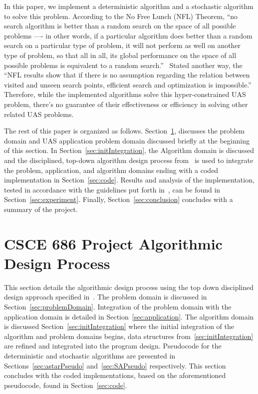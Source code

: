 \documentclass[conference]{IEEEtran}
\begin{document}
In this paper, we implement a deterministic algorithm and a stochastic
algorithm to solve this problem. According to the No Free Lunch (NFL) Theorem,
``no search algorithm is better than a random search on the space of all
possible problems —- in other words, if a particular algorithm does better than
a random search on a particular type of problem, it will not perform as well on
another type of problem, so that all in all, its global performance on the
space of all possible problems is equivalent to a random
search.''~\cite{collet2007, wiki:nfl} Stated another way, the ``NFL results
show that if there is no assumption regarding the relation between visited and
unseen search points, efficient search and optimization is
impossible.''~\cite{igel2014} Therefore, while the implemented algorithms solve
this hyper-constrained UAS problem, there's no guarantee of their effectiveness
or efficiency in solving other related UAS problems.

The rest of this paper is organized as follows.
Section~\ref{sec:designProcess}, discusses the problem domain and UAS
application problem domain discussed briefly at the beginning of this section.
In Section~\ref{sec:initIntegration}, the Algorithm domain is discussed and the
disciplined, top-down algorithm design process from~\cite{lamontDesign,
lamontSCP, lamontMIS} is used to integrate the problem, application, and
algorithm domains ending with a coded implementation in Section~\ref{sec:code}.
Results and analysis of the implementation, tested in accordance with the
guidelines put forth in~\cite{barr2001}, can be found in
Section~\ref{sec:experiment}. Finally, Section~\ref{sec:conclusion} concludes
with a summary of the project.

\section{CSCE 686 Project Algorithmic Design Process} \label{sec:designProcess}


This section details the algorithmic design process using the top down
disciplined design approach specified in~\cite{lamontDesign, lamontSCP}. The
problem domain is discussed in Section~\ref{sec:problemDomain}. Integration of
the problem domain with the application domain is detailed in
Section~\ref{sec:application}. The algorithm domain is discussed
Section~\ref{sec:initIntegration} where the initial integration of the
algorithm and problem domains begins, data structures
from~\ref{sec:initIntegration} are refined and integrated into the program
design.  Pseudocode for the deterministic and stochastic algorithms are
presented in Sections~\ref{sec:astarPseudo} and~\ref{sec:SAPseudo}
respectively. This section concludes with the coded implementations, based on
the aforementioned pseudocode, found in Section~\ref{sec:code}.
\end{document}
